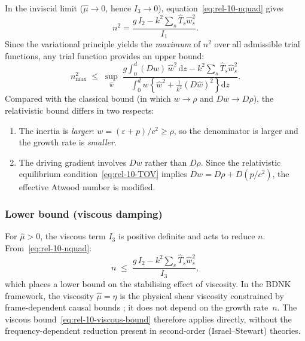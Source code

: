 In the inviscid limit ($\hat{\mu} \to 0$, hence $I_{3} \to 0$),
equation~\eqref{eq:rel-10-nquad} gives
\begin{equation}\label{eq:rel-10-ninviscid}
  n^{2} = \frac{g\,I_{2} - k^{2}\sum_{s}\hat{T}_{s}\hat{w}_{s}^{2}}
    {I_{1}}.
\end{equation}
Since the variational principle yields the \emph{maximum} of $n^{2}$
over all admissible trial functions, any trial function provides an
upper bound:
\begin{equation}\label{eq:rel-10-upper-bound}
  n_{\max}^{2} \;\leqslant\;
  \sup_{\hat{w}}\;
  \frac{g\displaystyle\int_{0}^{d}(Dw)\,\hat{w}^{2}\,\mathrm{d}z
    - k^{2}\sum_{s}\hat{T}_{s}\hat{w}_{s}^{2}}
    {\displaystyle\int_{0}^{d}
    w\!\left\{\hat{w}^{2}
    + \frac{1}{k^{2}}(D\hat{w})^{2}\right\}\mathrm{d}z}.
\end{equation}
Compared with the classical bound (in which $w \to \rho$ and $Dw \to
D\rho$), the relativistic bound differs in two respects:
\begin{enumerate}
\item The inertia is \emph{larger}: $w = (\varepsilon + p)/c^{2}
  \geqslant \rho$, so the denominator is larger and the growth rate is
  \emph{smaller}.
\item The driving gradient involves $Dw$ rather than $D\rho$.  Since
  the relativistic equilibrium condition~\eqref{eq:rel-10-TOV}
  implies $Dw = D\rho + D(p/c^{2})$, the effective Atwood number is
  modified.
\end{enumerate}

\subsubsection*{Lower bound (viscous damping)}

For $\hat{\mu} > 0$, the viscous term $I_{3}$ is positive definite
and acts to reduce $n$.  From~\eqref{eq:rel-10-nquad}:
\begin{equation}\label{eq:rel-10-viscous-bound}
  n \;\leqslant\;
  \frac{g\,I_{2} - k^{2}\sum_{s}\hat{T}_{s}\hat{w}_{s}^{2}}
    {I_{3}},
\end{equation}
which places a lower bound on the stabilising effect of viscosity.
In the BDNK framework, the viscosity $\hat{\mu} = \eta$ is the
physical shear viscosity constrained by frame-dependent causal
bounds \citep{BemficaDN2018,Kovtun2019}; it does not depend on the
growth rate~$n$.  The viscous bound~\eqref{eq:rel-10-viscous-bound}
therefore applies directly, without the frequency-dependent
reduction present in second-order (Israel--Stewart) theories.

